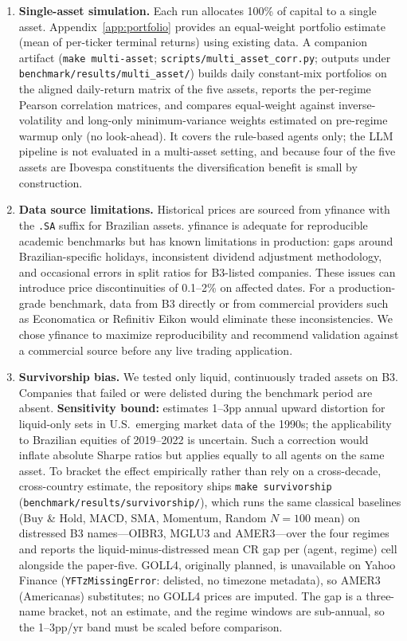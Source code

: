 \documentclass{article}
\begin{document}
\begin{enumerate}
\item \textbf{Single-asset simulation.} Each run allocates 100\% of
capital to a single asset. Appendix~\ref{app:portfolio} provides an
equal-weight portfolio estimate (mean of per-ticker terminal returns)
using existing data. A companion artifact
(\texttt{make multi-asset}; \texttt{scripts/multi\_asset\_corr.py};
outputs under \texttt{benchmark/results/multi\_asset/}) builds daily
constant-mix portfolios on the aligned daily-return matrix of the five
assets, reports the per-regime Pearson correlation matrices, and
compares equal-weight against inverse-volatility and long-only
minimum-variance weights estimated on pre-regime warmup only (no
look-ahead). It covers the rule-based agents only; the LLM pipeline
is not evaluated in a multi-asset setting, and because four of the
five assets are Ibovespa constituents the diversification benefit is
small by construction.

\item \textbf{Data source limitations.} Historical prices are sourced
from yfinance with the \texttt{.SA} suffix for Brazilian assets.
yfinance is adequate for reproducible academic benchmarks but has
known limitations in production: gaps around Brazilian-specific
holidays, inconsistent dividend adjustment methodology, and occasional
errors in split ratios for B3-listed companies. These issues can
introduce price discontinuities of 0.1--2\% on affected dates.
For a production-grade benchmark, data from B3 directly or from
commercial providers such as Economatica or Refinitiv Eikon would
eliminate these inconsistencies. We chose yfinance to maximize
reproducibility and recommend validation against a commercial source
before any live trading application.

\item \textbf{Survivorship bias.} We tested only liquid, continuously
traded assets on B3. Companies that failed or were delisted during the
benchmark period are absent. \textbf{Sensitivity bound:}
\cite{lesmond1999} estimates 1--3pp annual upward distortion for
liquid-only sets in U.S.\ emerging market data of the 1990s; the
applicability to Brazilian equities of 2019--2022 is uncertain.
Such a correction would inflate absolute Sharpe ratios but applies
equally to all agents on the same asset. To bracket the effect
empirically rather than rely on a cross-decade, cross-country estimate,
the repository ships \texttt{make survivorship}
(\texttt{benchmark/results/survivorship/}), which runs the same
classical baselines (Buy \& Hold, MACD, SMA, Momentum, Random $N{=}100$
mean) on distressed B3 names---OIBR3, MGLU3 and AMER3---over the four
regimes and reports the liquid-minus-distressed mean CR gap per (agent,
regime) cell alongside the paper-five. GOLL4, originally planned, is
unavailable on Yahoo Finance (\texttt{YFTzMissingError}: delisted, no
timezone metadata), so AMER3 (Americanas) substitutes; no GOLL4 prices
are imputed. The gap is a three-name bracket, not an estimate, and the
regime windows are sub-annual, so the 1--3pp/yr band must be scaled
before comparison.


\end{enumerate}
\end{document}
